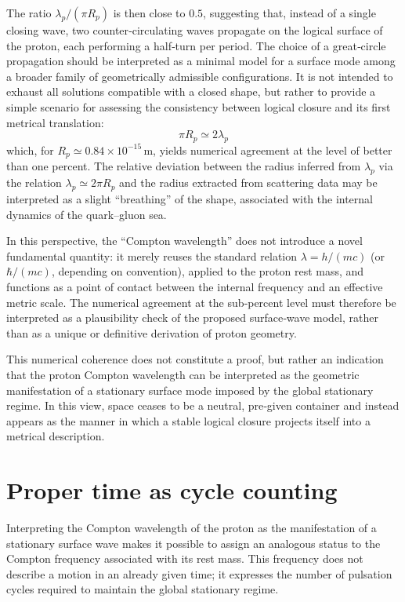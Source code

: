 \documentclass[11pt,a4paper]{article}
\begin{document}
The ratio \(\lambda_p / (\pi R_p)\) is then close to \(0.5\), suggesting that, instead of a single closing wave, two counter‑circulating waves propagate on the logical surface of the proton, each performing a half‑turn per period. The choice of a great‑circle propagation should be interpreted as a minimal model for a surface mode among a broader family of geometrically admissible configurations. It is not intended to exhaust all solutions compatible with a closed shape, but rather to provide a simple scenario for assessing the consistency between logical closure and its first metrical translation:
\[
\pi R_p \simeq 2 \lambda_p
\]
which, for \(R_p \simeq 0.84 \times 10^{-15}\,\mathrm{m}\), yields numerical agreement at the level of better than one percent. The relative deviation between the radius inferred from \(\lambda_p\) via the relation \(\lambda_p \simeq 2\pi R_p\) and the radius extracted from scattering data may be interpreted as a slight “breathing” of the shape, associated with the internal dynamics of the quark–gluon sea.

In this perspective, the “Compton wavelength” does not introduce a novel fundamental quantity: it merely reuses the standard relation \(\lambda = h/(mc)\) (or \(\hbar/(mc)\), depending on convention), applied to the proton rest mass, and functions as a point of contact between the internal frequency and an effective metric scale. The numerical agreement at the sub‑percent level must therefore be interpreted as a plausibility check of the proposed surface‑wave model, rather than as a unique or definitive derivation of proton geometry.

This numerical coherence does not constitute a proof, but rather an indication that the proton Compton wavelength can be interpreted as the geometric manifestation of a stationary surface mode imposed by the global stationary regime. In this view, space ceases to be a neutral, pre‑given container and instead appears as the manner in which a stable logical closure projects itself into a metrical description.

\section{Proper time as cycle counting}

Interpreting the Compton wavelength of the proton as the manifestation of a stationary surface wave makes it possible to assign an analogous status to the Compton frequency associated with its rest mass. This frequency does not describe a motion in an already given time; it expresses the number of pulsation cycles required to maintain the global stationary regime. 
\end{document}
